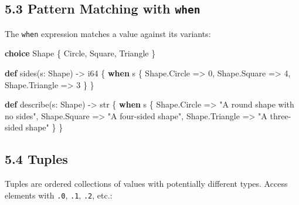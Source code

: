 \documentclass[
  english,
]{book}
\newenvironment{Shaded}{\begin{snugshade}}{\end{snugshade}}
\newcommand{\ControlFlowTok}[1]{\textcolor[rgb]{0.77,0.53,0.75}{\textbf{#1}}}
\newcommand{\DataTypeTok}[1]{\textcolor[rgb]{0.31,0.79,0.69}{#1}}
\newcommand{\DecValTok}[1]{\textcolor[rgb]{0.71,0.81,0.66}{#1}}
\newcommand{\KeywordTok}[1]{\textcolor[rgb]{0.34,0.61,0.84}{\textbf{#1}}}
\newcommand{\NormalTok}[1]{\textcolor[rgb]{0.83,0.83,0.83}{#1}}
\newcommand{\OperatorTok}[1]{\textcolor[rgb]{0.83,0.83,0.83}{#1}}
\newcommand{\StringTok}[1]{\textcolor[rgb]{0.81,0.57,0.47}{#1}}
\begin{document}
\subsection{\texorpdfstring{5.3 Pattern Matching with
\texttt{when}}{5.3 Pattern Matching with when}}\label{pattern-matching-with-when}

The \texttt{when} expression matches a value against its variants:

\begin{Shaded}
\begin{Highlighting}[]
\KeywordTok{choice}\NormalTok{ Shape \{}
\NormalTok{    Circle,}
\NormalTok{    Square,}
\NormalTok{    Triangle}
\NormalTok{\}}

\KeywordTok{def}\NormalTok{ sides(s: Shape) }\OperatorTok{{-}\textgreater{}} \DataTypeTok{i64}\NormalTok{ \{}
    \ControlFlowTok{when}\NormalTok{ s \{}
\NormalTok{        Shape}\OperatorTok{.}\NormalTok{Circle   }\OperatorTok{=\textgreater{}} \DecValTok{0}\NormalTok{,}
\NormalTok{        Shape}\OperatorTok{.}\NormalTok{Square   }\OperatorTok{=\textgreater{}} \DecValTok{4}\NormalTok{,}
\NormalTok{        Shape}\OperatorTok{.}\NormalTok{Triangle }\OperatorTok{=\textgreater{}} \DecValTok{3}
\NormalTok{    \}}
\NormalTok{\}}

\KeywordTok{def}\NormalTok{ describe(s: Shape) }\OperatorTok{{-}\textgreater{}} \DataTypeTok{str}\NormalTok{ \{}
    \ControlFlowTok{when}\NormalTok{ s \{}
\NormalTok{        Shape}\OperatorTok{.}\NormalTok{Circle   }\OperatorTok{=\textgreater{}} \StringTok{"A round shape with no sides"}\NormalTok{,}
\NormalTok{        Shape}\OperatorTok{.}\NormalTok{Square   }\OperatorTok{=\textgreater{}} \StringTok{"A four{-}sided shape"}\NormalTok{,}
\NormalTok{        Shape}\OperatorTok{.}\NormalTok{Triangle }\OperatorTok{=\textgreater{}} \StringTok{"A three{-}sided shape"}
\NormalTok{    \}}
\NormalTok{\}}
\end{Highlighting}
\end{Shaded}

\subsection{5.4 Tuples}\label{tuples}

Tuples are ordered collections of values with potentially different
types. Access elements with \texttt{.0}, \texttt{.1}, \texttt{.2}, etc.:
\end{document}

